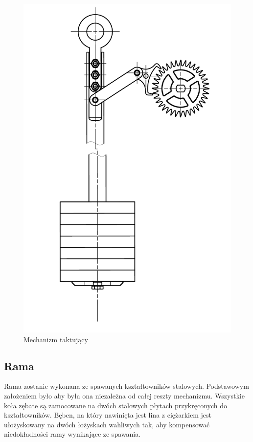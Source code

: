 			\begin{figure}
				\centering
				\includegraphics[width=0.6\linewidth]{Projekt/takt}
				\caption{Mechanizm taktujący}
				\label{fig:takt}
			\end{figure}
			

        \subsection{Rama}
        	Rama zostanie wykonana ze spawanych kształtowników stalowych. Podstawowym założeniem było aby była ona niezależna od całej reszty mechanizmu. Wszystkie koła zębate są zamocowane na dwóch stalowych płytach przykręconych do kształtowników. Bęben, na który nawinięta jest lina z ciężarkiem jest ułożyskowany na dwóch łożyskach wahliwych tak, aby kompensować niedokładności ramy wynikające ze spawania.
        
